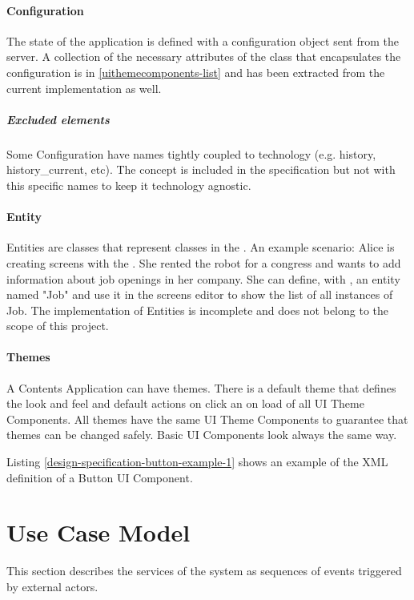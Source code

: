 \paragraph{Configuration} The state of the application is defined with a configuration object sent from the server.
A collection of the necessary attributes of the class that encapsulates the configuration is in \ref{uithemecomponents-list} and has been extracted from the current implementation as well.
\subparagraph{Excluded elements} Some Configuration have names tightly coupled to technology (e.g. history, history\_current, etc). 
The concept is included in the specification but not with this specific names to keep it technology agnostic.

\paragraph{Entity} Entities are classes that represent classes in the \se . 
An example scenario: Alice is creating screens with the \se .
She rented the robot for a congress and wants to add information about job openings in her company.
She can define, with \flangofe , an entity named "Job" and use it in the screens editor to show the list of all instances of Job.
The implementation of Entities is incomplete and does not belong to the scope of this project.

\paragraph{Themes} A Contents Application can have themes.
There is a default theme that defines the look and feel and default actions on click an on load of all UI Theme Components.
All themes have the same UI Theme Components to guarantee that themes can be changed safely.
Basic UI Components look always the same way.

Listing \ref{design-specification-button-example-1} shows an example of the \ac{XML} definition of a Button UI Component.



\FloatBarrier

\section{Use Case Model}
This section describes the services of the system as sequences of events triggered by external actors.

